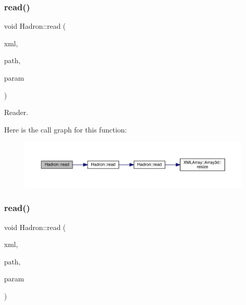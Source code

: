 \subsubsection{\texorpdfstring{read()}{read()}\hspace{0.1cm}{\footnotesize\ttfamily [15/94]}}
{\footnotesize\ttfamily void Hadron\+::read (\begin{DoxyParamCaption}\item[{\mbox{\hyperlink{classADATXML_1_1XMLReader}{X\+M\+L\+Reader}} \&}]{xml,  }\item[{const std\+::string \&}]{path,  }\item[{\mbox{\hyperlink{structHadron_1_1ValTimeSlice__t}{Val\+Time\+Slice\+\_\+t}} \&}]{param }\end{DoxyParamCaption})}



Reader. 

Here is the call graph for this function\+:
\nopagebreak
\begin{figure}[H]
\begin{center}
\leavevmode
\includegraphics[width=350pt]{d1/daf/namespaceHadron_aa4df93329eeddeec176cd9df5abe9ce1_cgraph}
\end{center}
\end{figure}
\mbox{\label{namespaceHadron_a921e2dea91400934dabd596c18164033}} 
\subsubsection{\texorpdfstring{read()}{read()}\hspace{0.1cm}{\footnotesize\ttfamily [16/94]}}
{\footnotesize\ttfamily void Hadron\+::read (\begin{DoxyParamCaption}\item[{\mbox{\hyperlink{classADATXML_1_1XMLReader}{X\+M\+L\+Reader}} \&}]{xml,  }\item[{const std\+::string \&}]{path,  }\item[{\mbox{\hyperlink{structHadron_1_1KeyHadronSUNNPartNPtCorr__t}{Key\+Hadron\+S\+U\+N\+N\+Part\+N\+Pt\+Corr\+\_\+t}} \&}]{param }\end{DoxyParamCaption})}



